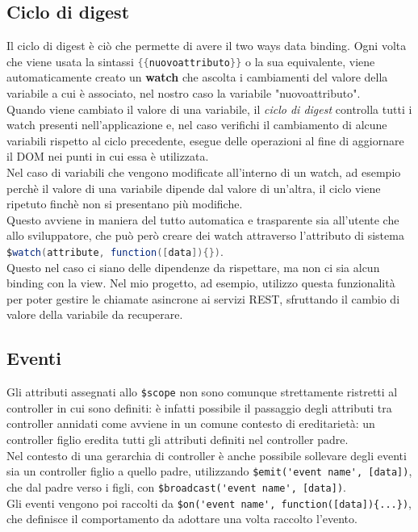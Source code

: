 \subsection{Ciclo di digest}%
Il ciclo di digest è ciò che permette di avere il two ways data binding. Ogni volta che viene usata la sintassi \lstinline[language=Java]!{{nuovoattributo}}! o la sua equivalente, viene automaticamente creato un \textbf{watch} che ascolta i cambiamenti del valore della variabile a cui è associato, nel nostro caso la variabile "nuovoattributo".\\
Quando viene cambiato il valore di una variabile, il \emph{ciclo di digest} controlla tutti i watch presenti nell'applicazione e, nel caso verifichi il cambiamento di alcune variabili rispetto al ciclo precedente, esegue delle operazioni al fine di aggiornare il DOM nei punti in cui essa è utilizzata.\\
Nel caso di variabili che vengono modificate all'interno di un watch, ad esempio perchè il valore di una variabile dipende dal valore di un'altra, il ciclo viene ripetuto finchè non si presentano più modifiche.\\
Questo avviene in maniera del tutto automatica e trasparente sia all'utente che allo sviluppatore, che può però creare dei watch attraverso l'attributo di sistema \lstinline[language=Java]!$watch(attribute, function([data]){})!.\\ Questo nel caso ci siano delle dipendenze da rispettare, ma non ci sia alcun binding con la view. Nel mio progetto, ad esempio, utilizzo questa funzionalità per poter gestire le chiamate asincrone ai servizi REST, sfruttando il cambio di valore della variabile da recuperare.


\subsection{Eventi} 
Gli attributi assegnati allo \lstinline[language=HTML]!$scope! non sono comunque strettamente ristretti al controller in cui sono definiti: è infatti possibile il passaggio degli attributi tra controller annidati come avviene in un comune contesto di ereditarietà: un controller figlio eredita tutti gli attributi definiti nel controller padre.\\ 
Nel contesto di una gerarchia di controller è anche possibile sollevare degli eventi sia un controller figlio a quello padre, utilizzando \lstinline[language=HTML]!$emit('event name', [data])!, che dal padre verso i figli, con \lstinline[language=HTML]!$broadcast('event name', [data])!.\\
Gli eventi vengono poi raccolti da \lstinline[language=HTML]!$on('event name', function([data]){...})!, che definisce il comportamento da adottare una volta raccolto l'evento.\\

